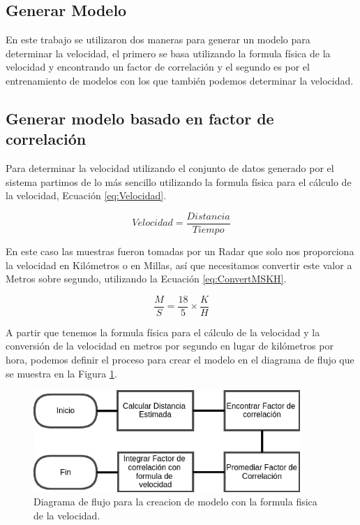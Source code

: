 \subsection{Generar Modelo}
\label{cap:GenerarModelo}

En este trabajo se utilizaron dos maneras para generar un modelo para determinar la velocidad, el primero se basa utilizando la formula física de la velocidad y encontrando un factor de correlación y el segundo es por el entrenamiento de modelos con los que también podemos determinar la velocidad.

\subsection{Generar modelo basado en factor de correlación}

Para determinar la velocidad utilizando el conjunto de datos generado por el sistema partimos de lo más sencillo utilizando la formula física para el cálculo de la velocidad, Ecuación \ref{eq:Velocidad}.

\begin{equation}
    \label{eq:Velocidad}
    Velocidad = \frac{Distancia}{Tiempo}
\end{equation}

En este caso las muestras fueron tomadas por un Radar que solo nos proporciona la velocidad en Kilómetros o en Millas, así que necesitamos convertir este valor a Metros sobre segundo, utilizando la Ecuación \ref{eq:ConvertMSKH}.

\begin{equation}
    \label{eq:ConvertMSKH}
    \frac{M}{S} = \frac{18}{5} \times \frac{K}{H}
\end{equation}

A partir que tenemos la formula física para el cálculo de la velocidad y la conversión de la velocidad en metros por segundo en lugar de kilómetros por hora, podemos definir el proceso para crear el modelo en el diagrama de flujo que se muestra en la Figura \ref{fig:CrearModeloCustom}.

\begin{figure}[H]
    \centering
    \includegraphics[width=0.9\textwidth]{Metodologia/imgs/CrearModeloCustom.png}
    \caption{Diagrama de flujo para la creacion de modelo con la formula fisica de la velocidad.}
    \label{fig:CrearModeloCustom}
\end{figure}


